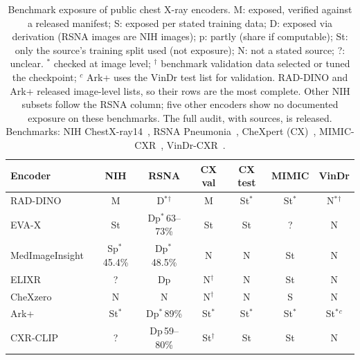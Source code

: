 \begin{table}[t]\centering\scriptsize\setlength{\tabcolsep}{2.4pt}
\caption{Benchmark exposure of public chest X-ray encoders. M: exposed, verified against a released manifest; S: exposed per stated training data; D: exposed via derivation (RSNA images are NIH images); p: partly (share if computable); St: only the source's training split used (not exposure); N: not a stated source; ?: unclear. $^*$ checked at image level; $^\dagger$ benchmark validation data selected or tuned the checkpoint; $^c$ Ark+ uses the VinDr test list for validation. RAD-DINO and Ark+ released image-level lists, so their rows are the most complete. Other NIH subsets follow the RSNA column; five other encoders show no documented exposure on these benchmarks. The full audit, with sources, is released. Benchmarks: NIH ChestX-ray14~\cite{wang2017chestxray8}, RSNA Pneumonia~\cite{shih2019rsna}, CheXpert (CX)~\cite{irvin2019chexpert}, MIMIC-CXR~\cite{johnson2019mimiccxr}, VinDr-CXR~\cite{nguyen2022vindrcxr}.}\label{tab:audit}
\begin{tabular}{lcccccc}
\toprule
Encoder & NIH & RSNA & CX val & CX test & MIMIC & VinDr \\
\midrule
RAD-DINO~\cite{perezgarcia2025raddino} & M & D$^*$$^\dagger$ & M & St$^*$ & St$^*$ & N$^*$$^\dagger$ \\
EVA-X~\cite{yao2025evax} & St & Dp$^*$\,{\tiny 63--73\%} & St & St & ? & N \\
MedImageInsight~\cite{codella2024medimageinsight} & Sp$^*$\,{\tiny 45.4\%} & Dp$^*$\,{\tiny 48.5\%} & N & N & St & N \\
ELIXR~\cite{xu2023elixr} & ? & Dp & N$^\dagger$ & N & St & N \\
CheXzero~\cite{tiu2022chexzero} & N & N & N$^\dagger$ & N & S & N \\
Ark{+}~\cite{ma2025arkplus} & St$^*$ & Dp$^*$\,{\tiny 89\%} & St$^*$ & St$^*$ & St$^*$ & St$^*$$^{c}$ \\
CXR-CLIP~\cite{you2023cxrclip} & ? & Dp\,{\tiny 59--80\%} & St$^\dagger$ & St & St & N \\
\bottomrule
\end{tabular}
\end{table}
